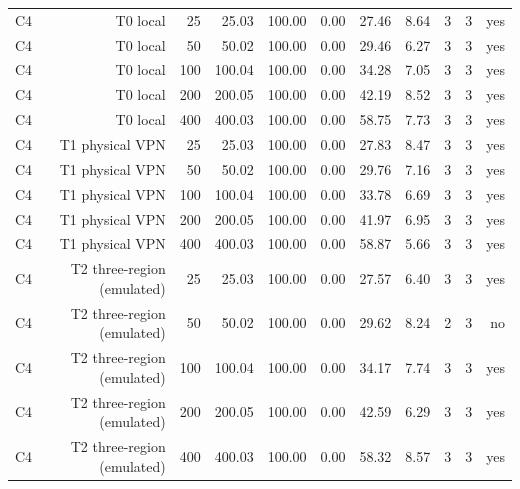 \begin{table}[t]
\begin{tabular}{lrrrrrrrrrr}
C4 & T0 local & 25 & 25.03 & 100.00 & 0.00 & 27.46 & 8.64 & 3 & 3 & yes \\
C4 & T0 local & 50 & 50.02 & 100.00 & 0.00 & 29.46 & 6.27 & 3 & 3 & yes \\
C4 & T0 local & 100 & 100.04 & 100.00 & 0.00 & 34.28 & 7.05 & 3 & 3 & yes \\
C4 & T0 local & 200 & 200.05 & 100.00 & 0.00 & 42.19 & 8.52 & 3 & 3 & yes \\
C4 & T0 local & 400 & 400.03 & 100.00 & 0.00 & 58.75 & 7.73 & 3 & 3 & yes \\
C4 & T1 physical VPN & 25 & 25.03 & 100.00 & 0.00 & 27.83 & 8.47 & 3 & 3 & yes \\
C4 & T1 physical VPN & 50 & 50.02 & 100.00 & 0.00 & 29.76 & 7.16 & 3 & 3 & yes \\
C4 & T1 physical VPN & 100 & 100.04 & 100.00 & 0.00 & 33.78 & 6.69 & 3 & 3 & yes \\
C4 & T1 physical VPN & 200 & 200.05 & 100.00 & 0.00 & 41.97 & 6.95 & 3 & 3 & yes \\
C4 & T1 physical VPN & 400 & 400.03 & 100.00 & 0.00 & 58.87 & 5.66 & 3 & 3 & yes \\
C4 & T2 three-region (emulated) & 25 & 25.03 & 100.00 & 0.00 & 27.57 & 6.40 & 3 & 3 & yes \\
C4 & T2 three-region (emulated) & 50 & 50.02 & 100.00 & 0.00 & 29.62 & 8.24 & 2 & 3 & no \\
C4 & T2 three-region (emulated) & 100 & 100.04 & 100.00 & 0.00 & 34.17 & 7.74 & 3 & 3 & yes \\
C4 & T2 three-region (emulated) & 200 & 200.05 & 100.00 & 0.00 & 42.59 & 6.29 & 3 & 3 & yes \\
C4 & T2 three-region (emulated) & 400 & 400.03 & 100.00 & 0.00 & 58.32 & 8.57 & 3 & 3 & yes \\
\hline
\end{tabular}
\end{table}
